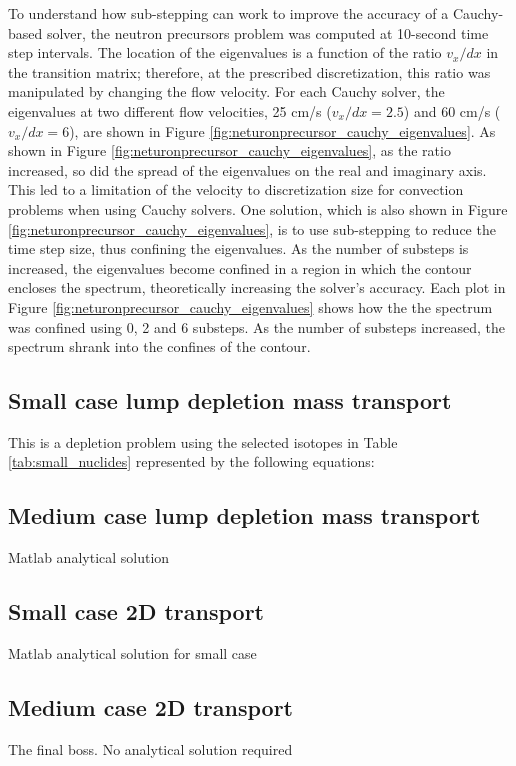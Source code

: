 To understand how sub-stepping can work to improve the accuracy of a Cauchy-based solver, the neutron precursors problem was computed at 10-second time step intervals. The location of the eigenvalues is a function of the ratio $v_{x}/dx$ in the transition matrix; therefore, at the prescribed discretization, this ratio was manipulated by changing the flow velocity. For each Cauchy solver, the eigenvalues at two different flow velocities, 25 cm/s ($v_{x}/dx = 2.5$) and 60 cm/s ($v_{x}/dx = 6$), are shown in Figure \ref{fig:neturonprecursor_cauchy_eigenvalues}. As shown in Figure \ref{fig:neturonprecursor_cauchy_eigenvalues}, as the ratio increased, so did the spread of the eigenvalues on the real and imaginary axis. This led to a limitation of the velocity to discretization size for convection problems when using Cauchy solvers. One solution, which is also shown in Figure \ref{fig:neturonprecursor_cauchy_eigenvalues}, is to use sub-stepping to reduce the time step size, thus confining the eigenvalues. As the number of substeps is increased, the eigenvalues become confined in a region in which the contour encloses the spectrum, theoretically increasing the solver's accuracy. Each plot in Figure \ref{fig:neturonprecursor_cauchy_eigenvalues} shows how the the spectrum was confined using 0, 2 and 6 substeps. As the number of substeps increased, the spectrum shrank into the confines of the contour. 


\subsection{Small case lump depletion mass transport}
This is a depletion problem using the selected isotopes in Table \ref{tab:small_nuclides} represented by the following equations:


\subsection{Medium case lump depletion mass transport}
Matlab analytical solution

\subsection{Small case 2D transport}
Matlab analytical solution for small case 

\subsection{Medium case 2D transport}
The final boss. No analytical solution required
